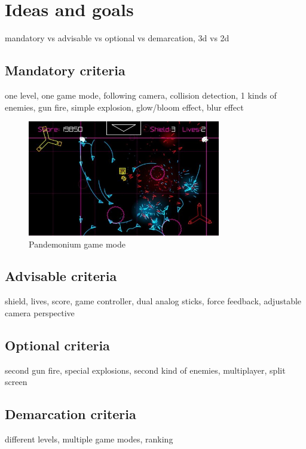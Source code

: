 \documentclass[a4paper]{article}
\begin{document}
\newpage

\section*{Ideas and goals}
mandatory vs advisable vs optional vs demarcation, 3d vs 2d

\subsection*{Mandatory criteria}
one level, one game mode, following camera, collision detection, 1 kinds of enemies, gun fire, simple explosion, glow/bloom effect, blur effect

\begin{figure}[htbp]
\centering
\includegraphics[width=0.75\textwidth]{4dd9c__pewpew-for-android-550x330.jpg}
\caption{Pandemonium game mode}
\end{figure}

\subsection*{Advisable criteria}
shield, lives, score, game controller, dual analog sticks, force feedback, adjustable camera perspective

\subsection*{Optional criteria}
second gun fire, special explosions, second kind of enemies, multiplayer, split screen

\subsection*{Demarcation criteria}
different levels, multiple game modes, ranking

\nocite{pewpewgame}
\nocite{iphoneappcafe}
\nocite{androidear}
\printbibliography

\listoffigures
\end{document}
